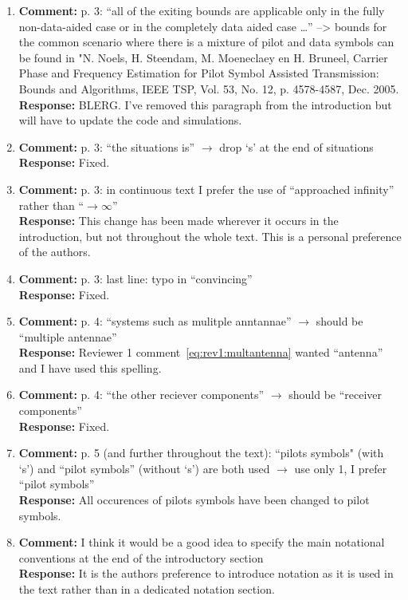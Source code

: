 \documentclass{article}
\begin{document}
\begin{enumerate}
\item \textbf{Comment:} p. 3: ``all of the exiting bounds are applicable only in the fully non-data-aided case or in the completely data aided case \dots'' --> bounds for the common scenario where there is a mixture of pilot and data symbols can be found in "N. Noels, H. Steendam, M. Moeneclaey en H. Bruneel, Carrier Phase and Frequency Estimation for Pilot Symbol Assisted Transmission: Bounds and Algorithms, IEEE TSP, Vol. 53, No. 12, p. 4578-4587, Dec. 2005. \\
\textbf{Response:} BLERG. I've removed this paragraph from the introduction but will have to update the code and simulations.

\item \textbf{Comment:} p. 3: ``the situations is'' $\to$ drop `s' at the end of situations \\
\textbf{Response:} Fixed.

\item \textbf{Comment:} p. 3: in continuous text I prefer the use of ``approached infinity'' rather than ``$\to \infty$'' \\
\textbf{Response:} This change has been made wherever it occurs in the introduction, but not throughout the whole text. This is a personal preference of the authors.

\item \textbf{Comment:} p. 3: last line: typo in ``convincing'' \\
\textbf{Response:} Fixed.

\item \textbf{Comment:} p. 4: ``systems such as mulitple anntannae'' $\to$ should be ``multiple antennae'' \\
\textbf{Response:} Reviewer 1 comment~\eqref{eq:rev1:multantenna} wanted ``antenna'' and I have used this spelling.

\item \textbf{Comment:} p. 4: ``the other reciever components'' $\to$ should be ``receiver components'' \\
\textbf{Response:} Fixed.

\item \textbf{Comment:} p. 5 (and further throughout the text): ``pilots symbols" (with `s') and ``pilot symbols'' (without `s') are both used $\to$ use only 1, I prefer ``pilot symbols'' \\
\textbf{Response:} All occurences of pilots symbols have been changed to pilot symbols. 

\item \label{rev2:commentnotationsection} \textbf{Comment:} I think it would be a good idea to specify the main notational conventions at the end of the introductory section \\
\textbf{Response:} It is the authors preference to introduce notation as it is used in the text rather than in a dedicated notation section. %


\end{enumerate}
\end{document}
